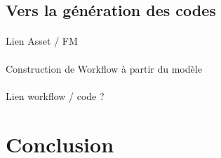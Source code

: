 \documentclass[]{easychair}
\begin{document}
\subsection{Vers la génération des codes}

\paragraph{}
Lien Asset / FM 

\paragraph{}
Construction de Workflow à partir du modèle

\paragraph{}
Lien workflow / code ?


\section{Conclusion}
\label{sect:conclusion}



%
\label{sect:bib}

%
%
%


\appendix


\end{document}
